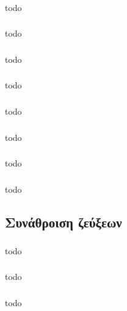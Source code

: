 \documentclass[a4paper, 12pt]{article}
\begin{document}
		\subsubsection{}
			todo

		\subsubsection{}
			todo

		\subsubsection{}
			todo

		\subsubsection{}
			todo

		\subsubsection{}
			todo

		\subsubsection{}
			todo

		\subsubsection{}		
			todo 
			
		\subsubsection{}
			todo

	\subsection{Συνάθροιση ζεύξεων}
		
		\subsubsection{}
			todo
		
		\subsubsection{}
			todo
		
		\subsubsection{}
			todo
		
\end{document}
